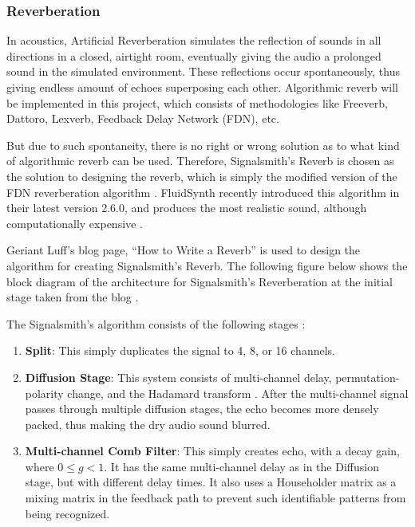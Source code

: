 \subsubsection{Reverberation}
\label{sec:reverb-discussion}

In acoustics, Artificial Reverberation simulates the reflection of sounds in all directions
in a closed, airtight room, eventually giving the audio a prolonged sound in the simulated
environment. These reflections occur spontaneously, thus giving endless amount of echoes superposing
each other. Algorithmic reverb will be implemented in this project, which consists of methodologies
like Freeverb, Dattoro, Lexverb, Feedback Delay Network (FDN), etc. \cite{valimaki2012fifty, fluidsynth_reverb_overview}

But due to such spontaneity, there is no right or wrong solution as to what kind of algorithmic reverb 
can be used. Therefore, Signalsmith's Reverb is chosen as the solution to designing the reverb,
which is simply the modified version of the FDN reverberation algorithm \cite{smith2010pasp}. FluidSynth recently introduced this 
algorithm in their latest version 2.6.0, and produces the most realistic sound, although computationally 
expensive \cite{fluidsynth_reverb_overview}.

Geriant Luff's blog page, ``How to Write a Reverb'' is used to design the algorithm for creating Signalsmith's Reverb.
The following figure below shows the block diagram of the architecture for Signalsmith's Reverberation
at the initial stage taken from the blog \cite{luff2021reverb}.



The Signalsmith's algorithm consists of the following stages \cite{luff2021reverb}:
\begin{enumerate}
    \item \textbf{Split}: This simply duplicates the signal to 4, 8, or 16 channels.
    \item \textbf{Diffusion Stage}: This system consists of multi-channel delay, permutation-polarity change, 
    and the Hadamard transform \cite{smith2010pasp}. After the multi-channel signal passes through multiple 
    diffusion stages, the echo becomes more densely packed, thus making the dry audio sound blurred.
    \item \textbf{Multi-channel Comb Filter}: This simply creates echo, with a decay gain, where $0 \leq g < 1$. It has
    the same multi-channel delay as in the Diffusion stage, but with different delay times. It also uses a 
    Householder matrix \cite{higham2020householder} as a mixing matrix in the feedback path to prevent 
    such identifiable patterns from being recognized.
\end{enumerate}

